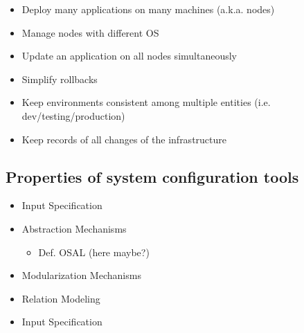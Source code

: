 	\begin{itemize}
		\item Deploy many applications on many machines (a.k.a. nodes)
		\item Manage nodes with different OS
		\item Update an application on all nodes simultaneously
		\item Simplify rollbacks
		\item Keep environments consistent among multiple entities (i.e. dev/testing/production)
		\item Keep records of all changes of the infrastructure
	\end{itemize}
	
\subsection{Properties of system configuration tools}

	\begin{itemize}
	\item Input Specification
	\item Abstraction Mechanisms
	\begin{itemize}
		\item Def. OSAL (here maybe?)
	\end{itemize}
	\item Modularization Mechanisms
	\item Relation Modeling
	\item Input Specification
	\end{itemize}
